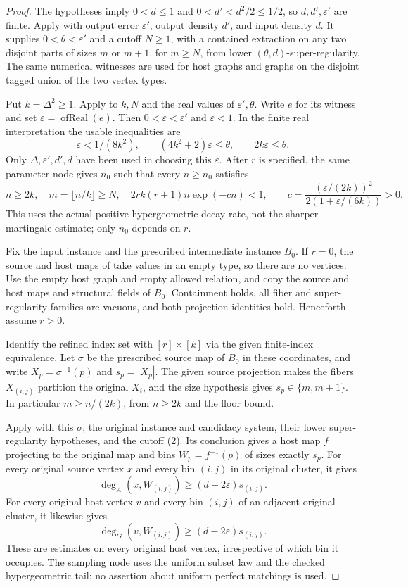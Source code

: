 \begin{proof}
The hypotheses imply $0<d\leq1$ and $0<d'<d^2/2\leq1/2$,
so $d,d',\varepsilon'$ are finite. Apply
 with output error
$\varepsilon'$, output density $d'$, and input density $d$.
It supplies $0<\theta<\varepsilon'$ and a cutoff $N\geq1$,
with a contained extraction on any two disjoint parts of sizes
$m$ or $m+1$, for $m\geq N$, from lower $(\theta,d)$-super-regularity.
The same numerical witnesses are used for host graphs and graphs
on the disjoint tagged union of the two vertex types.

Put $k=\Delta^2\geq1$. Apply 
to $k,N$ and the real values of $\varepsilon',\theta$. Write $e$
for its witness and set $\varepsilon=\operatorname{ofReal}(e)$.
Then $0<\varepsilon<\varepsilon'$ and $\varepsilon<1$. In the
finite real interpretation the usable inequalities are
\[
 \varepsilon<1/(8k^2),\qquad
 (4k^2+2)\varepsilon\leq\theta,\qquad
 2k\varepsilon\leq\theta.
 \tag{1}
\]
Only $\Delta,\varepsilon',d',d$ have been used in choosing this
$\varepsilon$. After $r$ is specified, the same parameter node
gives $n_0$ such that every $n\geq n_0$ satisfies
\[
 n\geq2k,\quad m=\lfloor n/k\rfloor\geq N,\quad
 2rk(r+1)n\exp(-cn)<1,\qquad
 c=\frac{(\varepsilon/(2k))^2}{2(1+\varepsilon/(6k))}>0.
 \tag{2}
\]
This uses the actual positive hypergeometric decay rate, not the
sharper martingale estimate; only $n_0$ depends on $r$.

Fix the input instance and the prescribed intermediate instance $B_0$.
If $r=0$, the source and host maps of
 take values in an empty type, so there are
no vertices. Use the empty host graph and empty allowed relation,
and copy the source and host maps and structural fields of $B_0$.
Containment holds, all fiber and super-regularity families are
vacuous, and both projection identities hold. Henceforth assume $r>0$.

Identify the refined index set with $[r]\times[k]$ via the given
finite-index equivalence. Let $\sigma$ be the prescribed source map
of $B_0$ in these coordinates, and write
$X_p=\sigma^{-1}(p)$ and $s_p=|X_p|$.
The given source projection makes the fibers $X_{(i,j)}$ partition
the original $X_i$, and the size hypothesis gives $s_p\in\{m,m+1\}$.
In particular $m\geq n/(2k)$, from $n\geq2k$ and the floor bound.

Apply  with this $\sigma$,
the original instance and candidacy system, their lower
super-regularity hypotheses, and the cutoff (2). Its conclusion
gives a host map $f$ projecting to the original map and bins
$W_p=f^{-1}(p)$ of sizes exactly $s_p$. For every original source
vertex $x$ and every bin $(i,j)$ in its original cluster, it gives
\[
 \deg_A(x,W_{(i,j)})\geq(d-2\varepsilon)s_{(i,j)}.
 \tag{3}
\]
For every original host vertex $v$ and every bin $(i,j)$ of an
adjacent original cluster, it likewise gives
\[
 \deg_G(v,W_{(i,j)})\geq(d-2\varepsilon)s_{(i,j)}.
 \tag{4}
\]
These are estimates on every original host vertex, irrespective of
which bin it occupies. The sampling node uses the uniform subset
law and the checked hypergeometric tail; no assertion about uniform
perfect matchings is used.


\end{proof}
